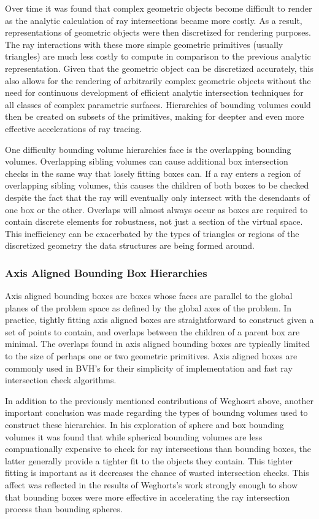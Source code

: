 \documentclass[10pt, a4paper]{article}
\begin{document}
Over time it was found that complex geometric objects become difficult to render as the analytic calculation of ray intersections became more costly. As a result, representations of geometric objects were then discretized for rendering purposes. The ray interactions with these more simple geometric primitives (usually triangles) are much less costly to compute in comparison to the previous analytic representation. Given that the geometric object can be discretized accurately, this also allows for the rendering of arbitrarily complex geometric objects without the need for continuous development of efficient analytic intersection techniques for all classes of complex parametric surfaces. Hierarchies of bounding volumes could then be created on subsets of the primitives, making for deepter and even more effective accelerations of ray tracing.

One difficulty bounding volume hierarchies face is the overlapping bounding volumes. Overlapping sibling volumes can cause additional box intersection checks in the same way that losely fitting boxes can. If a ray enters a region of overlapping sibling volumes, this causes the children of both boxes to be checked despite the fact that the ray will eventually only intersect with the desendants of one box or the other. Overlaps will almost always occur as boxes are required to contain discrete elements for robustness, not just a section of the virtual space. This inefficiency can be exacerbated by the types of triangles or regions of the discretized geometry the data structures are being formed around.


\subsubsection{Axis Aligned Bounding Box Hierarchies}

Axis aligned bounding boxes are boxes whose faces are parallel to the global planes of the problem space as defined by the global axes of the problem. In practice, tightly fitting axis aligned boxes are straightforward to construct given a set of points to contain, and overlaps between the children of a parent box are minimal. The overlaps found in axis aligned bounding boxes are typically limited to the size of perhaps one or two geometric primitives. Axis aligned boxes are commonly used in BVH's for their simplicity of implementation and fast ray intersection check algorithms.

In addition to the previously mentioned contributions of Weghosrt above, another important conclusion was made regarding the types of boundng volumes used to construct these hierarchies. In his exploration of sphere and box bounding volumes it was found that while spherical bounding volumes are less compuationally expensive to check for ray intersections than bounding boxes, the latter generally provide a tighter fit to the objects they contain. This tighter fitting is important as it decreases the chance of wasted intersection checks. This affect was reflected in the results of Weghorts's work strongly enough to show that bounding boxes were more effective in accelerating the ray intersection process than bounding spheres. 
\end{document}
